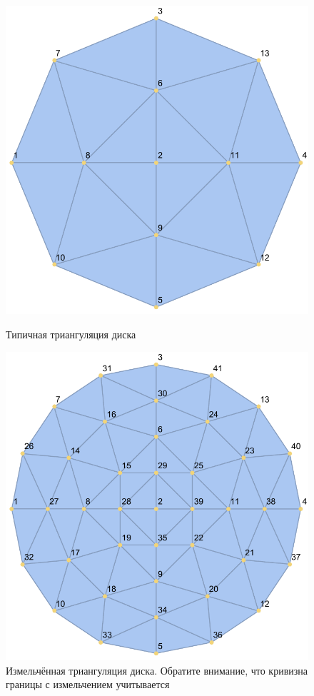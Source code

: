 \begin{figure}[!h]
	\includegraphics[width=\linewidth]{img/typicalMesh.pdf}
	\caption{Типичная триангуляция диска}\label{fig:typicalMesh}
	\endminipage\hfill
	\includegraphics[width=\linewidth]{img/typicalMeshRefined.pdf}
	\caption{Измельчённая триангуляция диска. Обратите внимание, что кривизна границы с измельчением учитывается}\label{fig:typicalMeshRefined}
	\endminipage
\end{figure}


